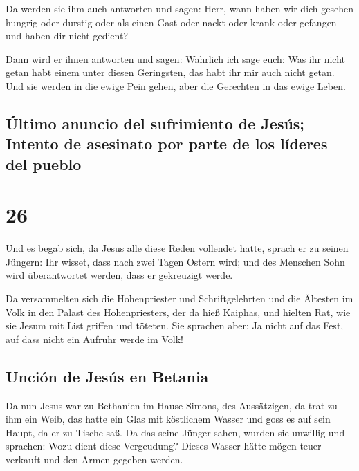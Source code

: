  Da werden sie ihm auch antworten und sagen: Herr, wann
haben wir dich gesehen hungrig oder durstig oder als einen Gast oder
nackt oder krank oder gefangen und haben dir nicht gedient?

 Dann wird er ihnen antworten und sagen: Wahrlich ich
sage euch: Was ihr nicht getan habt einem unter diesen Geringsten, das
habt ihr mir auch nicht getan.  Und sie werden in die
ewige Pein gehen, aber die Gerechten in das ewige Leben.

\hypertarget{uxfaltimo-anuncio-del-sufrimiento-de-jesuxfas-intento-de-asesinato-por-parte-de-los-luxedderes-del-pueblo}{%
\subsection{Último anuncio del sufrimiento de Jesús; Intento de
asesinato por parte de los líderes del
pueblo}\label{uxfaltimo-anuncio-del-sufrimiento-de-jesuxfas-intento-de-asesinato-por-parte-de-los-luxedderes-del-pueblo}}

\hypertarget{section-25}{%
\section{26}\label{section-25}}

 Und es begab sich, da Jesus alle diese Reden vollendet
hatte, sprach er zu seinen Jüngern:  Ihr wisset, dass nach
zwei Tagen Ostern wird; und des Menschen Sohn wird überantwortet werden,
dass er gekreuzigt werde.

 Da versammelten sich die Hohenpriester und
Schriftgelehrten und die Ältesten im Volk in den Palast des
Hohenpriesters, der da hieß Kaiphas,  und hielten Rat, wie
sie Jesum mit List griffen und töteten.  Sie sprachen
aber: Ja nicht auf das Fest, auf dass nicht ein Aufruhr werde im Volk!

\hypertarget{unciuxf3n-de-jesuxfas-en-betania}{%
\subsection{Unción de Jesús en
Betania}\label{unciuxf3n-de-jesuxfas-en-betania}}

 Da nun Jesus war zu Bethanien im Hause Simons, des
Aussätzigen,  da trat zu ihm ein Weib, das hatte ein Glas
mit köstlichem Wasser und goss es auf sein Haupt, da er zu Tische saß.
 Da das seine Jünger sahen, wurden sie unwillig und
sprachen: Wozu dient diese Vergeudung?  Dieses Wasser
hätte mögen teuer verkauft und den Armen gegeben werden.

